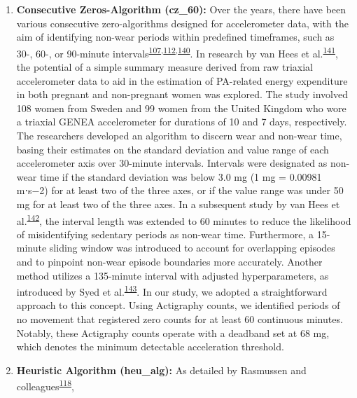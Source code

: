 \documentclass[
  10pt,
]{scrbook}
\let\originaltextbf\textbf
\renewcommand{\textbf}[1]{\textcolor{color1}{\originaltextbf{#1}}}
\begin{document}
\begin{enumerate}
\def\labelenumi{\arabic{enumi}.}
\item
  \textsf{\textbf{Consecutive Zeros-Algorithm (cz\_60):}} Over the
  years, there have been various consecutive zero-algorithms designed
  for accelerometer data, with the aim of identifying non-wear periods
  within predefined timeframes, such as 30-, 60-, or 90-minute
  intervals\textsuperscript{\protect\hyperlink{ref-choi_validation_2011}{107},\protect\hyperlink{ref-hecht_methodology_2009}{112},\protect\hyperlink{ref-troiano_physical_2008}{140}}.
  In research by van Hees et
  al.\textsuperscript{\protect\hyperlink{ref-van_hees_estimation_2011}{141}},
  the potential of a simple summary measure derived from raw triaxial
  accelerometer data to aid in the estimation of PA-related energy
  expenditure in both pregnant and non-pregnant women was explored. The
  study involved 108 women from Sweden and 99 women from the United
  Kingdom who wore a triaxial GENEA accelerometer for durations of 10
  and 7 days, respectively. The researchers developed an algorithm to
  discern wear and non-wear time, basing their estimates on the standard
  deviation and value range of each accelerometer axis over 30-minute
  intervals. Intervals were designated as non-wear time if the standard
  deviation was below 3.0 mg (1 mg = 0.00981 m⋅s−2) for at least two of
  the three axes, or if the value range was under 50 mg for at least two
  of the three axes. In a subsequent study by van Hees et
  al.\textsuperscript{\protect\hyperlink{ref-hees_separating_2013}{142}},
  the interval length was extended to 60 minutes to reduce the
  likelihood of misidentifying sedentary periods as non-wear time.
  Furthermore, a 15-minute sliding window was introduced to account for
  overlapping episodes and to pinpoint non-wear episode boundaries more
  accurately. Another method utilizes a 135-minute interval with
  adjusted hyperparameters, as introduced by Syed et
  al.\textsuperscript{\protect\hyperlink{ref-syed_evaluating_2020}{143}}.
  In our study, we adopted a straightforward approach to this concept.
  Using Actigraphy counts, we identified periods of no movement that
  registered zero counts for at least 60 continuous minutes. Notably,
  these Actigraphy counts operate with a deadband set at 68 mg, which
  denotes the minimum detectable acceleration threshold.
\item
  \textsf{\textbf{Heuristic Algorithm (heu\_alg):}} As detailed by
  Rasmussen and
  colleagues\textsuperscript{\protect\hyperlink{ref-rasmussen_short-term_2020}{118}},

\end{enumerate}
\end{document}

